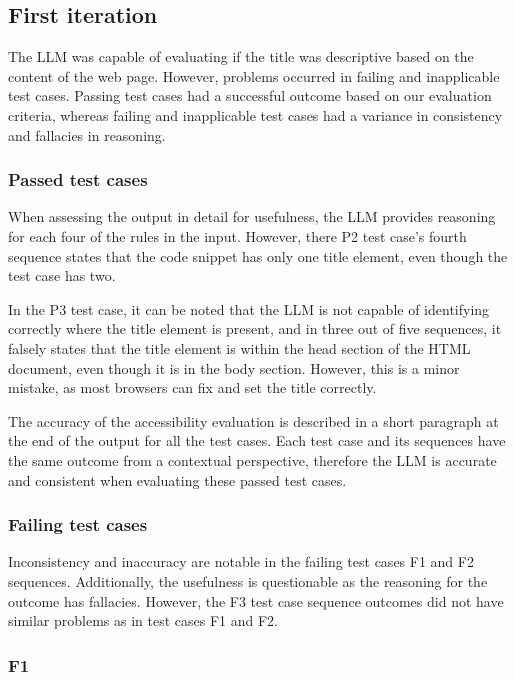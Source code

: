 \subsection{First iteration}

The LLM was capable of evaluating if the title was descriptive based on the content of the web page. However, problems occurred in failing and inapplicable test cases. Passing test cases had a successful outcome based on our evaluation criteria, whereas failing and inapplicable test cases had a variance in consistency and fallacies in reasoning.

\subsubsection{Passed test cases}

When assessing the output in detail for usefulness, the LLM provides reasoning for each four of the rules in the input. However, there P2 test case's fourth sequence states that the code snippet has only one title element, even though the test case has two. 

In the P3 test case, it can be noted that the LLM is not capable of identifying correctly where the title element is present, and in three out of five sequences, it falsely states that the title element is within the head section of the HTML document, even though it is in the body section. However, this is a minor mistake, as most browsers can fix and set the title correctly.

The accuracy of the accessibility evaluation is described in a short paragraph at the end of the output for all the test cases. Each test case and its sequences have the same outcome from a contextual perspective, therefore the LLM is accurate and consistent when evaluating these passed test cases.

\subsubsection{Failing test cases}

Inconsistency and inaccuracy are notable in the failing test cases F1 and F2 sequences. Additionally, the usefulness is questionable as the reasoning for the outcome has fallacies. However, the F3 test case sequence outcomes did not have similar problems as in test cases F1 and F2.

\subsubsection{F1}

